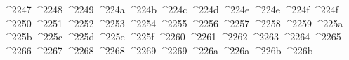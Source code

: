 {  ^^^^2247%
  ^^^^2248%
  ^^^^2249%
  ^^^^224a%
  ^^^^224b%
  ^^^^224c%
  ^^^^224d%
  ^^^^224e%
  ^^^^224e%
  ^^^^224f%
  ^^^^224f%
  ^^^^2250%
  ^^^^2251%
  ^^^^2252%
  ^^^^2253%
  ^^^^2254%
  ^^^^2255%
  ^^^^2256%
  ^^^^2257%
  ^^^^2258%
  ^^^^2259%
  ^^^^225a%
  ^^^^225b%
  ^^^^225c%
  ^^^^225d%
  ^^^^225e%
  ^^^^225f%
  ^^^^2260%
  ^^^^2261%
  ^^^^2262%
  ^^^^2263%
  ^^^^2264%
  ^^^^2265%
  ^^^^2266%
  ^^^^2267%
  ^^^^2268%
  ^^^^2268%
  ^^^^2269%
  ^^^^2269%
  ^^^^226a%
  ^^^^226a%
  ^^^^226b%
  ^^^^226b%
}
